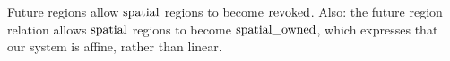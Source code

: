 \documentclass[a4paper]{article}
\begin{document}
%
Future regions allow $\mathrm{spatial}$ regions to become $\mathrm{revoked}$.
Also: the future region relation allows $\mathrm{spatial}$ regions to become $\mathrm{spatial\_owned}$, which expresses that our system is affine, rather than linear.
%
\end{document}

